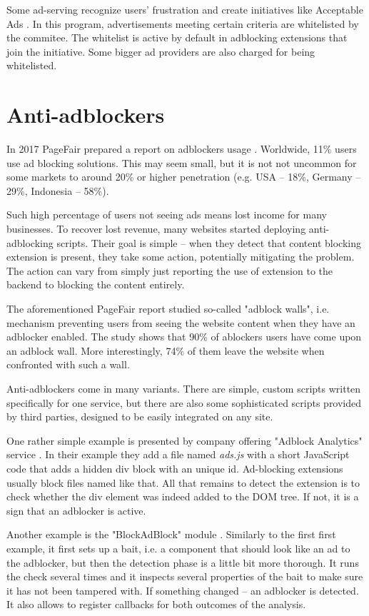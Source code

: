 Some ad-serving recognize users' frustration and create initiatives like Acceptable Ads \cite{acceptableads}.
In this program, advertisements meeting certain criteria are whitelisted by the commitee.
The whitelist is active by default in adblocking extensions that join the initiative.
Some bigger ad providers are also charged for being whitelisted.


\section{Anti-adblockers}
\label{anti-adblockers}

In 2017 PageFair prepared a report on adblockers usage \cite{pagefair:adblock-report}.
Worldwide, 11\% users use ad blocking solutions. This may seem small, but it is not not uncommon
for some markets to around 20\% or higher penetration (e.g. USA -- 18\%, Germany -- 29\%, Indonesia -- 58\%).

Such high percentage of users not seeing ads means lost income for many businesses.
To recover lost revenue, many websites started deploying anti-adblocking scripts.
Their goal is simple -- when they detect that content blocking extension is present, 
they take some action, potentially mitigating the problem.
The action can vary from simply just reporting the use of extension to the backend to blocking 
the content entirely.

The aforementioned PageFair report studied so-called "adblock walls", i.e. mechanism
preventing users from seeing the website content when they have an adblocker enabled.
The study shows that 90\% of ablockers users have come upon an adblock wall.
More interestingly, 74\% of them leave the website when confronted with such a wall.

Anti-adblockers come in many variants. There are simple, custom scripts written 
specifically for one service, but there are also some sophisticated scripts 
provided by third parties, designed to be easily integrated on any site.

One rather simple example is presented by company offering "Adblock Analytics" service \cite{detect-adblock}.
In their example they add a file named \emph{ads.js} with a short JavaScript code that adds a hidden div block with an unique id.
Ad-blocking extensions usually block files named like that. All that remains to detect the extension is to
check whether the div element was indeed added to the DOM tree. If not, it is a sign that an adblocker is active.

Another example is the "BlockAdBlock" module \cite{github:blockadblock}.
Similarly to the first first example, it first sets up a bait,
i.e. a component that should look like an ad to the adblocker, 
but then the detection phase is a little bit more thorough. It runs the check several times
and it inspects several properties of the bait to make sure it has not been tampered with.
If something changed -- an adblocker is detected.
It also allows to register callbacks for both outcomes of the analysis.

